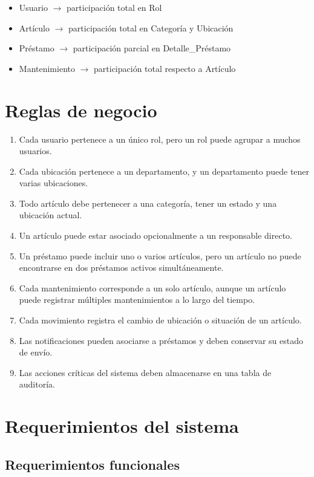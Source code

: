 \documentclass{article}
\begin{document}
\begin{itemize}
    \item Usuario $\rightarrow$ participación total en Rol
    \item Artículo $\rightarrow$ participación total en Categoría y Ubicación
    \item Préstamo $\rightarrow$ participación parcial en Detalle\_Préstamo
    \item Mantenimiento $\rightarrow$ participación total respecto a Artículo
\end{itemize}

\section{Reglas de negocio}

\begin{enumerate}
    \item Cada usuario pertenece a un único rol, pero un rol puede agrupar a muchos usuarios.
    \item Cada ubicación pertenece a un departamento, y un departamento puede tener varias ubicaciones.
    \item Todo artículo debe pertenecer a una categoría, tener un estado y una ubicación actual.
    \item Un artículo puede estar asociado opcionalmente a un responsable directo.
    \item Un préstamo puede incluir uno o varios artículos, pero un artículo no puede encontrarse en dos préstamos activos simultáneamente.
    \item Cada mantenimiento corresponde a un solo artículo, aunque un artículo puede registrar múltiples mantenimientos a lo largo del tiempo.
    \item Cada movimiento registra el cambio de ubicación o situación de un artículo.
    \item Las notificaciones pueden asociarse a préstamos y deben conservar su estado de envío.
    \item Las acciones críticas del sistema deben almacenarse en una tabla de auditoría.
\end{enumerate}

\section{Requerimientos del sistema}

\subsection{Requerimientos funcionales}
\end{document}
